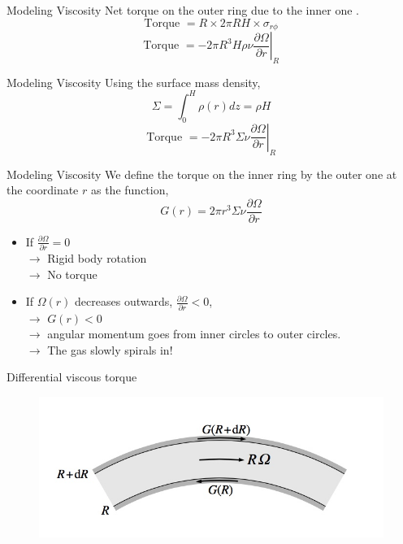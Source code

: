 \documentclass{beamer}
\begin{document}
\begin{frame}{Modeling Viscosity}
	Net torque on the outer ring due to the inner one	.
	\pause
	\[ \textrm{Torque } = R \times 2\pi R H \times \sigma_{r\phi} \] 
	\pause
	\[\textrm{Torque } = -2 \pi R^3 H \rho \nu  \left. \frac{\partial \Omega}{\partial r} \right|_R \]
\end{frame}

\begin{frame}{Modeling Viscosity}
	Using the surface mass density, 
	\pause
	\[ \Sigma = \int_0^H \rho(r) dz = \rho H \] 
	\pause
	\[\textrm{Torque } = -2 \pi R^3 \Sigma \nu  \left. \frac{\partial \Omega}{\partial r} \right|_R \]
\end{frame}


\begin{frame}{Modeling Viscosity}
	We define the torque on the inner ring by the outer one at the coordinate $r$ as the function, 
	\pause
	\[G(r) = 2 \pi r^3 \Sigma \nu \frac{\partial \Omega}{\partial r}\]
	\begin{itemize}
	\item If $\frac{\partial \Omega}{\partial r}=0$\\ 
	\pause
	$\rightarrow$ Rigid body rotation\\
	\pause
	$\rightarrow$ No torque
	\pause
	
	\item If $\Omega (r)$ decreases outwards, $\frac{\partial \Omega}{\partial r}<0$,\\
	\pause
	$\rightarrow$ $G(r)<0$\\
	\pause
	$\rightarrow$ angular momentum goes from inner circles to outer circles.\\
	\pause
	$\rightarrow$ The gas slowly spirals in!
	\end{itemize}
\end{frame}

\begin{frame}{Differential viscous torque}
	\begin{center}
      \begin{figure}
      	\includegraphics[scale=0.4] {figures/differentialRotation2.jpeg}
      \end{figure}
	\end{center}	
\end{frame}
\end{document}
